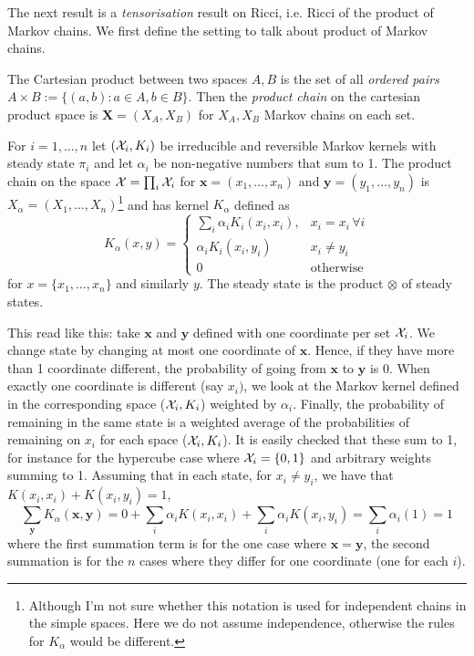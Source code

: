 The next result is a \emph{tensorisation} result on Ricci, i.e. Ricci of the product of Markov chains. We first define the setting to talk about product of Markov chains. 

The Cartesian product between two spaces $A,B$ is the set of all \emph{ordered pairs} $A\times B:=\{(a,b):a\in A, b\in B\}$. Then the \emph{product chain} on the cartesian product space is $\mathbf{X}=(X_A,X_B)$ for $X_A,X_B$ Markov chains on each set. 

For $i = 1,\ldots,n$ let $(\mathcal{X}_i,K_i)$ be irreducible and reversible Markov kernels with steady state $\pi_i$ and let $\alpha_i$ be non-negative numbers that sum to 1. The product chain on the space $\mathcal{X}=\prod_i\mathcal{X}_i$ for $\mathbf{x}=(x_1,\ldots,x_n)$ and $\mathbf{y}=(y_1,\ldots,y_n)$ is $X_\alpha=(X_1,\ldots,X_n)$\footnote{Although I'm not sure whether this notation is used for independent chains in the simple spaces. Here we do not assume independence, otherwise the rules for $K_\alpha$ would be different.} and has kernel $K_\alpha$ defined as
\[
K_\alpha(x,y)= \begin{cases}
    \sum_i \alpha_i K_i(x_i,x_i), &x_i=x_i \,\forall i\\
    \alpha_i K_i(x_i,y_i) &x_i\neq y_i\\
    0 &\text{otherwise}
\end{cases}
\]
for $x=\{x_1, \ldots, x_n\}$ and similarly $y$. The steady state is the product $\otimes$ of steady states.

This read like this: take $\mathbf{x}$ and $\mathbf{y}$ defined with one coordinate per set $\mathcal{X}_i$. We change state by changing at most one coordinate of $\mathbf{x}$. Hence, if they have more than 1 coordinate different, the probability of going from $\mathbf{x}$ to $\mathbf{y}$ is 0. When exactly one coordinate is different (say $x_i)$, we look at the Markov kernel defined in the corresponding space ($\mathcal{X}_i, K_i$) weighted by $\alpha_i$. Finally, the probability of remaining in the same state is a weighted average of the probabilities of remaining on $x_i$ for each space ($\mathcal{X}_i, K_i$). It is easily checked that these sum to 1, for instance for the hypercube case where $\mathcal{X}_i=\{0,1\}$ and arbitrary weights summing to 1. Assuming that in each state, for $x_i \neq y_i$, we have that $K(x_i,x_i)+K(x_i,y_i)=1$, 
\[
\sum_\mathbf{y}K_\alpha(\mathbf{x},\mathbf{y}) = 0 + \sum_i \alpha_i K(x_i,x_i) + \sum_i \alpha_iK(x_i,y_i) = \sum_i \alpha_i (1) =1
\]
where the first summation term is for the one case where $\mathbf{x}=\mathbf{y}$, the second summation is for the $n$ cases where they differ for one coordinate (one for each $i$).

